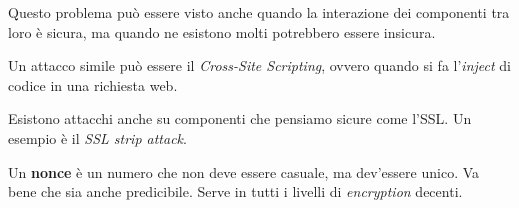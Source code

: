 Questo problema può essere visto anche quando la interazione dei componenti tra 
loro è sicura, ma quando ne esistono molti potrebbero essere insicura.

Un attacco simile può essere il \textit{Cross-Site Scripting}, ovvero quando si 
fa l'\textit{inject} di codice in una richiesta web.


Esistono attacchi anche su componenti che pensiamo sicure come l'SSL. Un
esempio è il \textit{SSL strip attack}.

Un \textbf{nonce} è un numero che non deve essere casuale, ma dev'essere unico. 
Va bene che sia anche predicibile. Serve in tutti i livelli di 
\textit{encryption} decenti.